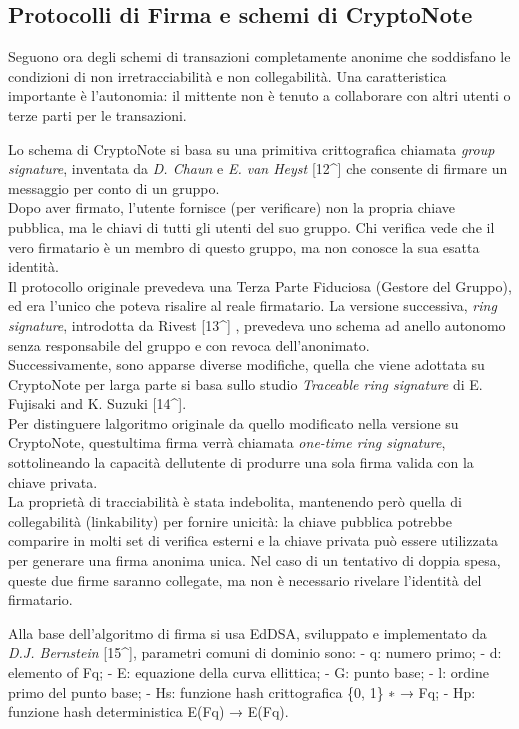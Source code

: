 \documentclass[
]{article}
\begin{document}
\subsection{Protocolli di Firma e schemi di
CryptoNote}\label{protocolli-di-firma-e-schemi-di-cryptonote}

Seguono ora degli schemi di transazioni completamente anonime che
soddisfano le condizioni di non irretracciabilità e non collegabilità.
Una caratteristica importante è l'autonomia: il mittente non è tenuto a
collaborare con altri utenti o terze parti per le transazioni.

Lo schema di CryptoNote si basa su una primitiva crittografica chiamata
\emph{group signature}, inventata da \emph{D. Chaun} e \emph{E. van
Heyst} {[}12\^{}{]} che consente di firmare un messaggio per conto di un
gruppo.\\
Dopo aver firmato, l'utente fornisce (per verificare) non la propria
chiave pubblica, ma le chiavi di tutti gli utenti del suo gruppo. Chi
verifica vede che il vero firmatario è un membro di questo gruppo, ma
non conosce la sua esatta identità.\\
Il protocollo originale prevedeva una Terza Parte Fiduciosa (Gestore del
Gruppo), ed era l'unico che poteva risalire al reale firmatario. La
versione successiva, \emph{ring} \emph{signature}, introdotta da Rivest
{[}13\^{}{]} , prevedeva uno schema ad anello autonomo senza
responsabile del gruppo e con revoca dell'anonimato.\\
Successivamente, sono apparse diverse modifiche, quella che viene
adottata su CryptoNote per larga parte si basa sullo studio
\emph{Traceable ring signature} di E. Fujisaki and K. Suzuki
{[}14\^{}{]}.\\
Per distinguere l\textquotesingle algoritmo originale da quello
modificato nella versione su CryptoNote, quest\textquotesingle ultima
firma verrà chiamata \emph{one-time ring signature}, sottolineando la
capacità dell\textquotesingle utente di produrre una sola firma valida
con la chiave privata.\\
La proprietà di tracciabilità è stata indebolita, mantenendo però quella
di collegabilità (linkability) per fornire unicità: la chiave pubblica
potrebbe comparire in molti set di verifica esterni e la chiave privata
può essere utilizzata per generare una firma anonima unica. Nel caso di
un tentativo di doppia spesa, queste due firme saranno collegate, ma non
è necessario rivelare l'identità del firmatario.

Alla base dell'algoritmo di firma si usa EdDSA, sviluppato e
implementato da \emph{D.J. Bernstein} {[}15\^{}{]}, parametri comuni di
dominio sono: - q: numero primo; - d: elemento of Fq; - E: equazione
della curva ellittica; - G: punto base; - l: ordine primo del punto
base; - Hs: funzione hash crittografica \{0, 1\} ∗ → Fq; - Hp: funzione
hash deterministica E(Fq) → E(Fq).
\end{document}
